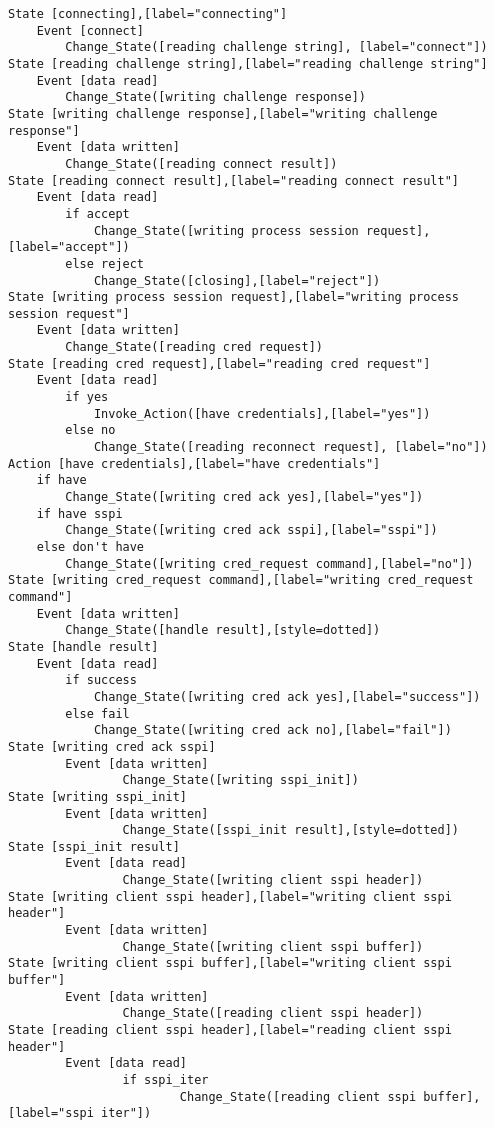 \begin{comment}
This is the state machine for the smpd connect command.
Graph [smpd connect],
      [size="7.5, 10"]
\end{comment}
\begin{verbatim}
State [connecting],[label="connecting"]
	Event [connect]
		Change_State([reading challenge string], [label="connect"])
State [reading challenge string],[label="reading challenge string"]
	Event [data read]
		Change_State([writing challenge response])
State [writing challenge response],[label="writing challenge response"]
	Event [data written]
		Change_State([reading connect result])
State [reading connect result],[label="reading connect result"]
	Event [data read]
		if accept
			Change_State([writing process session request],[label="accept"])
		else reject
			Change_State([closing],[label="reject"])
State [writing process session request],[label="writing process session request"]
	Event [data written]
		Change_State([reading cred request])
State [reading cred request],[label="reading cred request"]
	Event [data read]
		if yes
			Invoke_Action([have credentials],[label="yes"])
		else no
			Change_State([reading reconnect request], [label="no"])
Action [have credentials],[label="have credentials"]
	if have
		Change_State([writing cred ack yes],[label="yes"])
	if have sspi
		Change_State([writing cred ack sspi],[label="sspi"])
	else don't have
		Change_State([writing cred_request command],[label="no"])
State [writing cred_request command],[label="writing cred_request command"]
	Event [data written]
		Change_State([handle result],[style=dotted])
State [handle result]
	Event [data read]
		if success
			Change_State([writing cred ack yes],[label="success"])
		else fail
			Change_State([writing cred ack no],[label="fail"])
State [writing cred ack sspi]
        Event [data written]
                Change_State([writing sspi_init])
State [writing sspi_init]
        Event [data written]
                Change_State([sspi_init result],[style=dotted])
State [sspi_init result]
        Event [data read]
                Change_State([writing client sspi header])
State [writing client sspi header],[label="writing client sspi header"]
        Event [data written]
                Change_State([writing client sspi buffer])
State [writing client sspi buffer],[label="writing client sspi buffer"]
        Event [data written]
                Change_State([reading client sspi header])
State [reading client sspi header],[label="reading client sspi header"]
        Event [data read]
                if sspi_iter
                        Change_State([reading client sspi buffer],[label="sspi iter"])

\end{verbatim}
